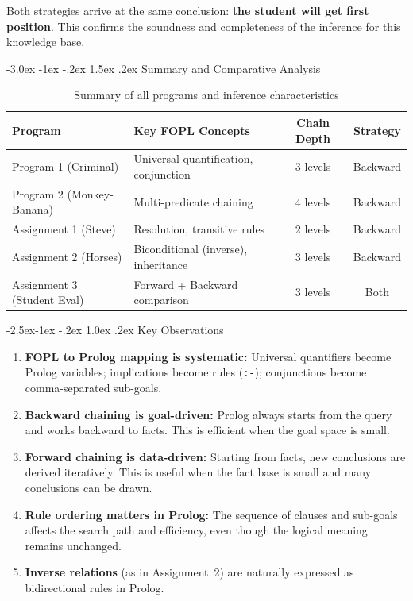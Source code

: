 \documentclass[12pt,a4paper]{article}
\makeatletter
\renewcommand{\section}{\@startsection{section}{1}{\z@}%
  {-3.0ex \@plus -1ex \@minus -.2ex}%
  {1.5ex \@plus.2ex}%
  {\normalfont\Large\bfseries\color{primaryblue}}}
\renewcommand{\subsection}{\@startsection{subsection}{2}{\z@}%
  {-2.5ex\@plus -1ex \@minus -.2ex}%
  {1.0ex \@plus .2ex}%
  {\normalfont\large\bfseries\color{accentblue}}}
\makeatother
\begin{document}
Both strategies arrive at the same conclusion: \textbf{the student will get first position}. This confirms the soundness and completeness of the inference for this knowledge base.

\newpage
\section{Summary and Comparative Analysis}

\begin{table}[H]
\centering
\caption{Summary of all programs and inference characteristics}
\begin{tabularx}{\textwidth}{@{}lXcc@{}}
\toprule
\textbf{Program} & \textbf{Key FOPL Concepts} & \textbf{Chain Depth} & \textbf{Strategy} \\
\midrule
Program 1 (Criminal) & Universal quantification, conjunction & 3 levels & Backward \\
Program 2 (Monkey-Banana) & Multi-predicate chaining & 4 levels & Backward \\
Assignment 1 (Steve) & Resolution, transitive rules & 2 levels & Backward \\
Assignment 2 (Horses) & Biconditional (inverse), inheritance & 3 levels & Backward \\
Assignment 3 (Student Eval) & Forward + Backward comparison & 3 levels & Both \\
\bottomrule
\end{tabularx}
\end{table}

\subsection{Key Observations}
\begin{enumerate}
  \item \textbf{FOPL to Prolog mapping is systematic:} Universal quantifiers become Prolog variables; implications become rules (\texttt{:-}); conjunctions become comma-separated sub-goals.
  \item \textbf{Backward chaining is goal-driven:} Prolog always starts from the query and works backward to facts. This is efficient when the goal space is small.
  \item \textbf{Forward chaining is data-driven:} Starting from facts, new conclusions are derived iteratively. This is useful when the fact base is small and many conclusions can be drawn.
  \item \textbf{Rule ordering matters in Prolog:} The sequence of clauses and sub-goals affects the search path and efficiency, even though the logical meaning remains unchanged.
  \item \textbf{Inverse relations} (as in Assignment~2) are naturally expressed as bidirectional rules in Prolog.
\end{enumerate}
\end{document}
